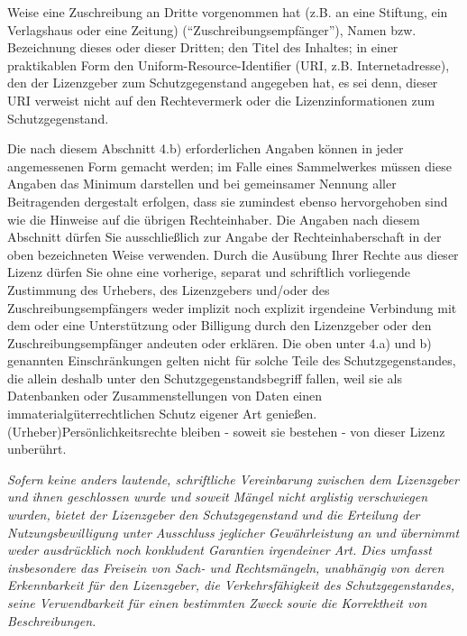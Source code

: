 \begin{description}
\begin{compactitem}
    Weise eine Zuschreibung an Dritte vorgenommen hat
    (z.B. an eine Stiftung, ein Verlagshaus oder eine
    Zeitung) (\enquote{Zuschreibungsempfänger}), Namen bzw.
    Bezeichnung dieses oder dieser Dritten; den Titel
    des Inhaltes; in einer praktikablen Form den
    Uniform-Resource-Identifier (URI, z.B.
    Internetadresse), den der Lizenzgeber zum
    Schutzgegenstand angegeben hat, es sei denn, dieser
    URI verweist nicht auf den Rechtevermerk oder die
    Lizenzinformationen zum Schutzgegenstand.
  \end{compactitem}
  Die nach diesem Abschnitt 4.b) erforderlichen Angaben
  können in jeder angemessenen Form gemacht werden; im
  Falle eines Sammelwerkes müssen diese Angaben das
  Minimum darstellen und bei gemeinsamer Nennung aller
  Beitragenden dergestalt erfolgen, dass sie zumindest
  ebenso hervorgehoben sind wie die Hinweise auf die
  übrigen Rechteinhaber. Die Angaben nach diesem Abschnitt
  dürfen Sie ausschließlich zur Angabe der
  Rechteinhaberschaft in der oben bezeichneten Weise
  verwenden. Durch die Ausübung Ihrer Rechte aus dieser
  Lizenz dürfen Sie ohne eine vorherige, separat und
  schriftlich vorliegende Zustimmung des Urhebers, des
  Lizenzgebers und/oder des Zuschreibungsempfängers weder
  implizit noch explizit irgendeine Verbindung mit dem
  oder eine Unterstützung oder Billigung durch den
  Lizenzgeber oder den Zuschreibungsempfänger andeuten
  oder erklären.
  Die oben unter 4.a) und b) genannten Einschränkungen
  gelten nicht für solche Teile des Schutzgegenstandes,
  die allein deshalb unter den Schutzgegenstandsbegriff
  fallen, weil sie als Datenbanken oder Zusammenstellungen
  von Daten einen immaterialgüterrechtlichen Schutz
  eigener Art genießen.
  (Urheber)Persönlichkeitsrechte bleiben - soweit sie
  bestehen - von dieser Lizenz unberührt.
  \item[5. Gewährleistung]
  {\itshape Sofern keine anders lautende, schriftliche
  Vereinbarung zwischen dem Lizenzgeber und ihnen geschlossen wurde und
  soweit Mängel nicht arglistig verschwiegen wurden, bietet
  der Lizenzgeber den Schutzgegenstand und die Erteilung der
  Nutzungsbewilligung unter Ausschluss jeglicher
  Gewährleistung an und übernimmt weder ausdrücklich noch
  konkludent Garantien irgendeiner Art. Dies umfasst
  insbesondere das Freisein von Sach- und Rechtsmängeln,
  unabhängig von deren Erkennbarkeit für den Lizenzgeber, die
  Verkehrsfähigkeit des Schutzgegenstandes, seine
  Verwendbarkeit für einen bestimmten Zweck sowie die
  Korrektheit von Beschreibungen.}
  \item[6. Haftungsbeschränkung]

\end{description}
